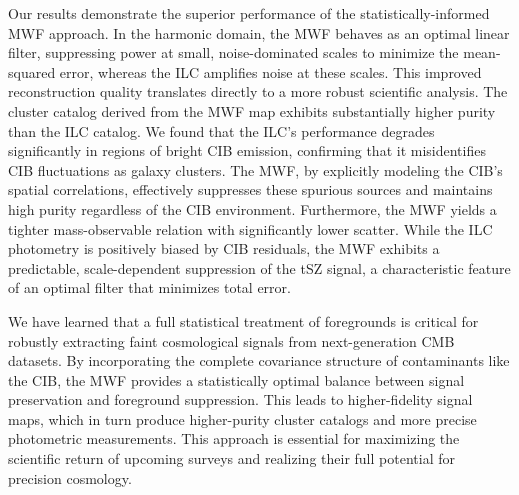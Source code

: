 \documentclass[]{article}
\begin{document}
Our results demonstrate the superior performance of the statistically-informed MWF approach. In the harmonic domain, the MWF behaves as an optimal linear filter, suppressing power at small, noise-dominated scales to minimize the mean-squared error, whereas the ILC amplifies noise at these scales. This improved reconstruction quality translates directly to a more robust scientific analysis. The cluster catalog derived from the MWF map exhibits substantially higher purity than the ILC catalog. We found that the ILC's performance degrades significantly in regions of bright CIB emission, confirming that it misidentifies CIB fluctuations as galaxy clusters. The MWF, by explicitly modeling the CIB's spatial correlations, effectively suppresses these spurious sources and maintains high purity regardless of the CIB environment. Furthermore, the MWF yields a tighter mass-observable relation with significantly lower scatter. While the ILC photometry is positively biased by CIB residuals, the MWF exhibits a predictable, scale-dependent suppression of the tSZ signal, a characteristic feature of an optimal filter that minimizes total error.

We have learned that a full statistical treatment of foregrounds is critical for robustly extracting faint cosmological signals from next-generation CMB datasets. By incorporating the complete covariance structure of contaminants like the CIB, the MWF provides a statistically optimal balance between signal preservation and foreground suppression. This leads to higher-fidelity signal maps, which in turn produce higher-purity cluster catalogs and more precise photometric measurements. This approach is essential for maximizing the scientific return of upcoming surveys and realizing their full potential for precision cosmology.


{}

\end{document}
